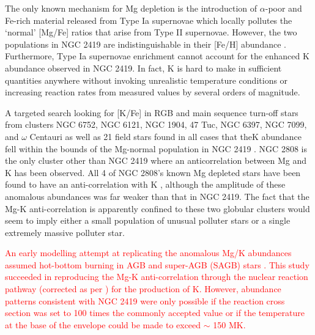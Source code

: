 \documentclass[a4paper,fleqn,usenatbib]{mnras}
\newcommand{\todo}[1]{\textcolor{red}{#1}}
\begin{document}
The only known mechanism for Mg depletion is the introduction of $\alpha$-poor and Fe-rich material released from Type Ia supernovae \citep{tsujimoto2012first} which locally pollutes the `normal' [Mg/Fe] ratios that arise from Type II supernovae. However, the two populations in NGC 2419 are indistinguishable in their [Fe/H] abundance \citep{cohenkirby2012}. Furthermore, Type Ia supernovae enrichment cannot account for the enhanced K abundance observed in NGC 2419. In fact, K is hard to make in sufficient quantities anywhere without invoking unrealistic temperature conditions or increasing reaction rates from measured values by several orders of magnitude. 



A targeted search looking for [K/Fe] in RGB and main sequence turn-off stars from clusters NGC 6752, NGC 6121, NGC 1904, 47 Tuc, NGC 6397, NGC 7099, and $\omega$ Centauri as well as 21 field stars found in all cases  that theK abundance fell within the bounds of the Mg-normal population in NGC 2419 \citep{carretta2013}. NGC 2808 is the only cluster other than NGC 2419 where an anticorrelation between Mg and K has been observed. All 4 of NGC 2808's known Mg depleted stars have been found to have an anti-correlation with K \citep{mucciarelli2015}, although the amplitude of these anomalous abundances was far weaker than that in NGC 2419. The fact that the Mg-K anti-correlation is apparently confined to these two globular clusters would seem to imply either a small population of unusual polluter stars or a single extremely massive polluter star.

\todo{An early modelling attempt at replicating the anomalous Mg/K abundances assumed hot-bottom burning in AGB and super-AGB (SAGB) stars \citep{ventura2012}. This study succeeded in reproducing the Mg-K anti-correlation through the nuclear reaction pathway \ce{^{36}Ar(p,\gamma)^{37}K(\beta ^+ \nu)^{37}Ar(e^-,\nu)^{37}Cl(p,\gamma)^{38}Ar(p,\gamma)^39K} (corrected as per \cite{iliadis2016}) for the production of K. However, abundance patterns consistent with NGC 2419 were only possible if the reaction cross section was set to 100 times the commonly accepted value or if the temperature at the base of the envelope could be made to exceed $\sim$ 150 MK.}
\end{document}
